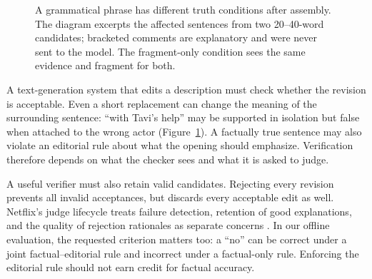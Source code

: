 \documentclass[10pt,letterpaper,twocolumn]{article}
\makeatletter
\renewcommand{\section}{\@startsection{section}{1}{0pt}{-2ex plus -.5ex minus -.2ex}{1.5ex plus .3ex minus .2ex}{\normalfont\fontsize{11}{13}\selectfont\bfseries\raggedright}}
\let\cite\citep
\makeatother
\begin{document}
\begin{figure}[t]
\centering
{}
\caption{A grammatical phrase has different truth conditions after assembly. The diagram excerpts the affected sentences from two 20--40-word candidates; bracketed comments are explanatory and were never sent to the model. The fragment-only condition sees the same evidence and fragment for both.}
\label{fig:collision}
\end{figure}



\section{INTRODUCTION}
A text-generation system that edits a description must check whether the revision is acceptable. Even a short replacement can change the meaning of the surrounding sentence: ``with Tavi's help'' may be supported in isolation but false when attached to the wrong actor (Figure~\ref{fig:collision}). A factually true sentence may also violate an editorial rule about what the opening should emphasize. Verification therefore depends on what the checker sees and what it is asked to judge.

A useful verifier must also retain valid candidates. Rejecting every revision prevents all invalid acceptances, but discards every acceptable edit as well. Netflix's judge lifecycle treats failure detection, retention of good explanations, and the quality of rejection rationales as separate concerns \cite{kong2026}. In our offline evaluation, the requested criterion matters too: a ``no'' can be correct under a joint factual--editorial rule and incorrect under a factual-only rule. Enforcing the editorial rule should not earn credit for factual accuracy.
\end{document}
